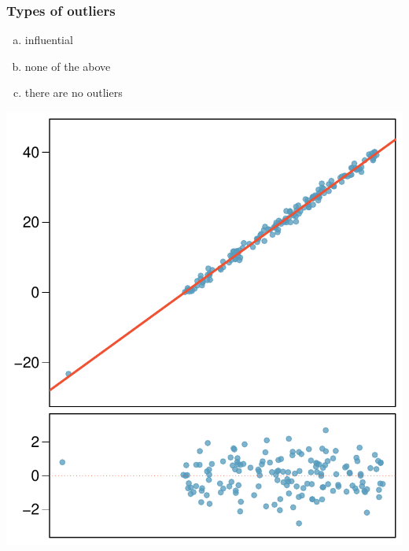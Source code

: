 
\begin{frame}
\frametitle{Types of outliers}

{
\begin{enumerate}[(a)]
\item influential
\item none of the above
\item there are no outliers
\end{enumerate}
}
{
\begin{center}
\includegraphics[width=\textwidth]{8-3_outliers/figures/outlierPlots/out6}
\end{center}
}

\end{frame}


